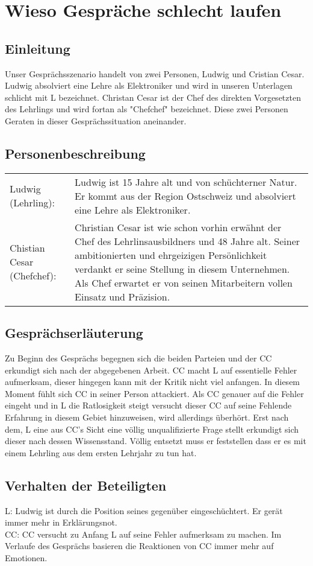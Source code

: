 \section*{Wieso Gespräche schlecht laufen}
\subsection*{Einleitung}
Unser Gesprächsszenario handelt von zwei Personen, Ludwig und Cristian Cesar. Ludwig absolviert eine Lehre als Elektroniker und wird in unseren Unterlagen schlicht mit L bezeichnet. Christan Cesar ist der Chef des direkten Vorgesetzten des Lehrlings und wird fortan als "Chefchef" bezeichnet. Diese zwei Personen Geraten in dieser Gesprächssituation aneinander.
\subsection*{Personenbeschreibung}
\begin{tabular}{p{150pt}p{280pt}}
Ludwig (Lehrling):	&
Ludwig ist 15 Jahre alt und von schüchterner Natur. Er kommt aus der Region Ostschweiz und absolviert eine Lehre als Elektroniker.\\ 
Chistian Cesar (Chefchef): & 
Christian Cesar ist wie schon vorhin erwähnt  der Chef des Lehrlinsausbildners und 48 Jahre alt. Seiner ambitionierten und ehrgeizigen Persönlichkeit verdankt er seine Stellung in diesem Unternehmen. Als Chef erwartet er von seinen 		Mitarbeitern vollen Einsatz und Präzision.
\end{tabular}

\subsection*{Gesprächserläuterung}
Zu Beginn des Gesprächs begegnen sich die beiden Parteien und der CC erkundigt sich nach der abgegebenen Arbeit. CC macht L auf essentielle Fehler aufmerksam, dieser hingegen kann mit der Kritik nicht viel anfangen. In diesem Moment fühlt sich CC in seiner Person attackiert. Als CC genauer auf die Fehler eingeht und in L die Ratlosigkeit steigt versucht dieser CC auf seine Fehlende Erfahrung in diesem Gebiet hinzuweisen, wird allerdings überhört. Erst nach dem, L eine aus CC's Sicht eine völlig unqualifizierte Frage stellt erkundigt sich dieser nach dessen Wissensstand. Völlig entsetzt muss er feststellen dass er es mit einem Lehrling aus dem ersten Lehrjahr zu tun hat. 
\subsection*{Verhalten der Beteiligten}
L: 	Ludwig ist durch die Position seines gegenüber eingeschüchtert. Er gerät immer mehr in Erklärungsnot.\\
CC:	CC versucht zu Anfang L auf seine Fehler aufmerksam zu machen. Im Verlaufe des Gesprächs basieren die Reaktionen von CC immer mehr auf Emotionen.\\


